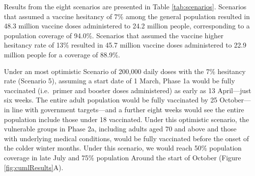 \documentclass{article}
\begin{document}
Results from the eight scenarios are presented in Table
\ref{tab:scenarios}. Scenarios that assumed a vaccine hesitancy of 7\%
among the general population resulted in 48.3 million vaccine doses
administered to 24.2 million people, corresponding to a population
coverage of 94.0\%. Scenarios that assumed the vaccine higher hesitancy
rate of 13\% resulted in 45.7 million vaccine doses administered to 22.9
million people for a coverage of 88.9\%.

Under an most optimistic Scenario of 200,000 daily doses with the 7\%
hesitancy rate (Scenario 5), assuming a start date of 1 March, Phase 1a
would be fully vaccinated (i.e.~primer and booster doses administered)
as early as 13 April---just six weeks. The entire adult population would
be fully vaccinated by 25 October---in line with government
targets---and a further eight weeks would see the entire population
include those under 18 vaccinated. Under this optimistic scenario, the
vulnerable groups in Phase 2a, including adults aged 70 and above and
those with underlying medical conditions, would be fully vaccinated
before the onset of the colder winter months. Under this scenario, we
would reach 50\% population coverage in late July and 75\% population
Around the start of October (Figure \ref{fig:cumlResults}A).
\end{document}
